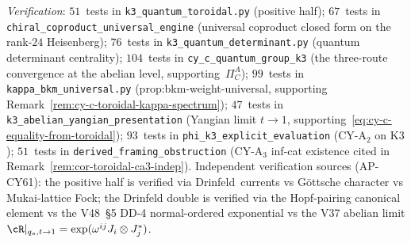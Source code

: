 \noindent\textit{Verification}: $51$~tests in
\texttt{k3\_quantum\_toroidal.py} (positive half); $67$~tests in
\texttt{chiral\_coproduct\_universal\_engine} (universal coproduct
closed form on the rank-$24$ Heisenberg); $76$~tests in
\texttt{k3\_quantum\_determinant.py} (quantum determinant centrality);
$104$~tests in \texttt{cy\_c\_quantum\_group\_k3} (the three-route
convergence at the abelian level, supporting~$\Pi_C^A$);
$99$~tests in \texttt{kappa\_bkm\_universal.py}
(prop:bkm-weight-universal, supporting
Remark~\ref{rem:cy-c-toroidal-kappa-spectrum}); $47$~tests in
\texttt{k3\_abelian\_yangian\_presentation} (Yangian limit
$t \to 1$, supporting~\eqref{eq:cy-c-equality-from-toroidal});
$93$~tests in \texttt{phi\_k3\_explicit\_evaluation} (CY-A$_2$ on K$3$);
$51$~tests in \texttt{derived\_framing\_obstruction} (CY-A$_3$ inf-cat
existence cited in Remark~\ref{rem:cor-toroidal-ca3-indep}).
Independent verification sources (AP-CY61): the positive half is
verified via Drinfeld~currents vs G\"ottsche character vs Mukai-lattice
Fock; the Drinfeld double is verified via the Hopf-pairing canonical
element vs the V48~\S5 DD-4 normal-ordered exponential vs the V37
abelian limit $\cR|_{q_a, t \to 1} = \exp(\omega^{ij} J_i \otimes J_j^*)$.
